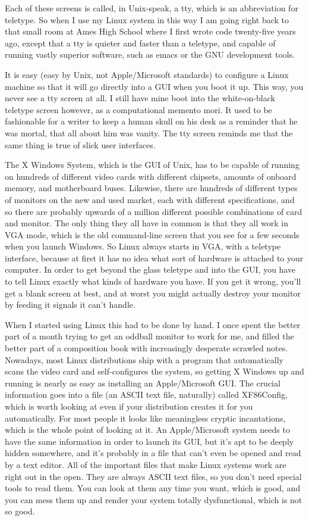 \documentclass[
  fontsize=11pt,
  paper=landscape,
  twocolumn=true,
  pagesize=pdftex,
  headings=small,
  DIV=15,
  ]{scrartcl}
\begin{document}
Each of these screens is called, in Unix-speak, a tty, which is an
abbreviation for teletype. So when I use my Linux system in this way I
am going right back to that small room at Ames High School where I first
wrote code twenty-five years ago, except that a tty is quieter and
faster than a teletype, and capable of running vastly superior software,
such as emacs or the GNU development tools.

It is easy (easy by Unix, not Apple/Microsoft standards) to configure a
Linux machine so that it will go directly into a GUI when you boot it
up. This way, you never see a tty screen at all. I still have mine boot
into the white-on-black teletype screen however, as a computational
memento mori. It used to be fashionable for a writer to keep a human
skull on his desk as a reminder that he was mortal, that all about him
was vanity. The tty screen reminds me that the same thing is true of
slick user interfaces.

The X Windows System, which is the GUI of Unix, has to be capable of
running on hundreds of different video cards with different chipsets,
amounts of onboard memory, and motherboard buses. Likewise, there are
hundreds of different types of monitors on the new and used market, each
with different specifications, and so there are probably upwards of a
million different possible combinations of card and monitor. The only
thing they all have in common is that they all work in VGA mode, which
is the old command-line screen that you see for a few seconds when you
launch Windows. So Linux always starts in VGA, with a teletype
interface, because at first it has no idea what sort of hardware is
attached to your computer. In order to get beyond the glass teletype and
into the GUI, you have to tell Linux exactly what kinds of hardware you
have. If you get it wrong, you'll get a blank screen at best, and at
worst you might actually destroy your monitor by feeding it signals it
can't handle.

When I started using Linux this had to be done by hand. I once spent the
better part of a month trying to get an oddball monitor to work for me,
and filled the better part of a composition book with increasingly
desperate scrawled notes. Nowadays, most Linux distributions ship with a
program that automatically scans the video card and self-configures the
system, so getting X Windows up and running is nearly as easy as
installing an Apple/Microsoft GUI. The crucial information goes into a
file (an ASCII text file, naturally) called XF86Config, which is worth
looking at even if your distribution creates it for you automatically.
For most people it looks like meaningless cryptic incantations, which is
the whole point of looking at it. An Apple/Microsoft system needs to
have the same information in order to launch its GUI, but it's apt to be
deeply hidden somewhere, and it's probably in a file that can't even be
opened and read by a text editor. All of the important files that make
Linux systems work are right out in the open. They are always ASCII text
files, so you don't need special tools to read them. You can look at
them any time you want, which is good, and you can mess them up and
render your system totally dysfunctional, which is not so good.
\end{document}
